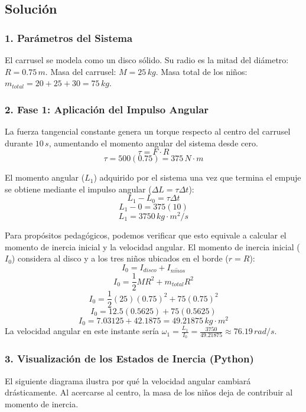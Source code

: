 \documentclass[12pt, a4paper]{article}
\begin{document}
\subsection*{Solución}

\subsubsection*{1. Parámetros del Sistema}
El carrusel se modela como un disco sólido. Su radio es la mitad del diámetro: $R = 0.75 \, \si{m}$.
Masa del carrusel: $M = 25 \, \si{kg}$.
Masa total de los niños: $m_{total} = 20 + 25 + 30 = 75 \, \si{kg}$.

\subsubsection*{2. Fase 1: Aplicación del Impulso Angular}
La fuerza tangencial constante genera un torque respecto al centro del carrusel durante $10 \, \si{s}$, aumentando el momento angular del sistema desde cero.
$$\tau = F \cdot R$$
$$\tau = 500(0.75) = 375 \, \si{N\cdot m}$$

El momento angular ($L_1$) adquirido por el sistema una vez que termina el empuje se obtiene mediante el impulso angular ($\Delta L = \tau \Delta t$):
$$L_1 - L_0 = \tau \Delta t$$
$$L_1 - 0 = 375(10)$$
$$L_1 = 3750 \, \si{kg\cdot m^2/s}$$

Para propósitos pedagógicos, podemos verificar que esto equivale a calcular el momento de inercia inicial y la velocidad angular. 
El momento de inercia inicial ($I_0$) considera al disco y a los tres niños ubicados en el borde ($r = R$):
$$I_0 = I_{disco} + I_{ni\tilde{n}os}$$
$$I_0 = \frac{1}{2} M R^2 + m_{total} R^2$$
$$I_0 = \frac{1}{2}(25)(0.75)^2 + 75(0.75)^2$$
$$I_0 = 12.5(0.5625) + 75(0.5625)$$
$$I_0 = 7.03125 + 42.1875 = 49.21875 \, \si{kg\cdot m^2}$$
La velocidad angular en este instante sería $\omega_1 = \frac{L_1}{I_0} = \frac{3750}{49.21875} \approx 76.19 \, \si{rad/s}$.

\subsubsection*{3. Visualización de los Estados de Inercia (Python)}
El siguiente diagrama ilustra por qué la velocidad angular cambiará drásticamente. Al acercarse al centro, la masa de los niños deja de contribuir al momento de inercia.
\end{document}
